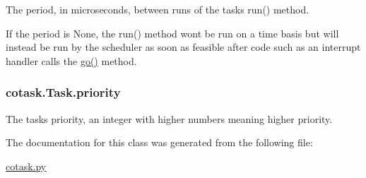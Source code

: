 The period, in microseconds, between runs of the task\textquotesingle{}s {\ttfamily run()} method. 

If the period is {\ttfamily None}, the {\ttfamily run()} method won\textquotesingle{}t be run on a time basis but will instead be run by the scheduler as soon as feasible after code such as an interrupt handler calls the {\ttfamily \hyperlink{classcotask_1_1Task_a78e74d18a5ba94074c2b5309394409a5}{go()}} method. 
\subsubsection[{\texorpdfstring{priority}{priority}}]{\setlength{\rightskip}{0pt plus 5cm}cotask.\+Task.\+priority}\hypertarget{classcotask_1_1Task_aeced93c7b7d23e33de9693d278aef88b}{}\label{classcotask_1_1Task_aeced93c7b7d23e33de9693d278aef88b}


The task\textquotesingle{}s priority, an integer with higher numbers meaning higher priority. 



The documentation for this class was generated from the following file\+:\begin{DoxyCompactItemize}
\item 
\hyperlink{cotask_8py}{cotask.\+py}\end{DoxyCompactItemize}
